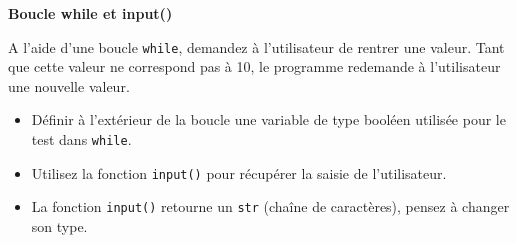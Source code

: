     \begin{Exercice}[10 minutes] \textbf{Boucle while et input()}
      	
      	A l'aide d'une boucle \lstinline{while}, demandez à l'utilisateur de rentrer une valeur. Tant que cette valeur ne correspond pas à 10, le programme redemande à l'utilisateur une nouvelle valeur.
    
        \begin{conseil}
           \begin{itemize}
           	\item Définir à l'extérieur de la boucle une variable de type booléen utilisée pour le test dans \lstinline{while}.
           	\item Utilisez la fonction \lstinline{input()} pour récupérer la saisie de l'utilisateur.
           	\item La fonction \lstinline{input()} retourne un \lstinline{str} (chaîne de caractères), pensez à changer son type.
           \end{itemize}
		     
        \end{conseil}
        
        \begin{solution}
            
        \end{solution}
    \end{Exercice}
    
